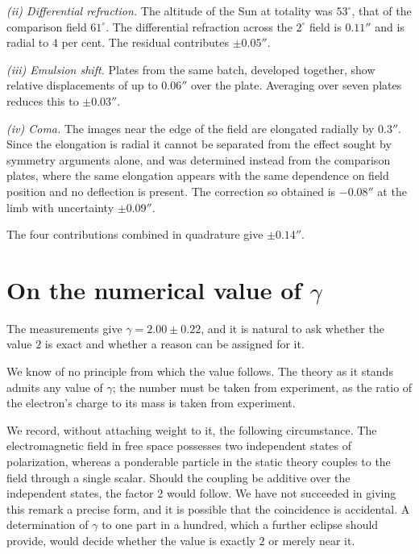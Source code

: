 \documentclass[aps,prd,reprint,amsmath,amssymb,nofootinbib,longbibliography]{revtex4-2}
\begin{document}
\emph{(ii) Differential refraction.} The altitude of the Sun at totality was $53^\circ$, that of the
comparison field $61^\circ$. The differential refraction across the $2^\circ$ field is $0.11''$ and
is radial to $4$ per cent. The residual contributes $\pm 0.05''$.

\emph{(iii) Emulsion shift.} Plates from the same batch, developed together, show relative
displacements of up to $0.06''$ over the plate. Averaging over seven plates reduces this to
$\pm 0.03''$.

\emph{(iv) Coma.} The images near the edge of the field are elongated radially by $0.3''$. Since the
elongation is radial it cannot be separated from the effect sought by symmetry arguments alone, and
was determined instead from the comparison plates, where the same elongation appears with the same
dependence on field position and no deflection is present. The correction so obtained is
$-0.08''$ at the limb with uncertainty $\pm 0.09''$.

The four contributions combined in quadrature give $\pm 0.14''$.

\section{On the numerical value of $\gamma$}
\label{app:gamma}

The measurements give $\gamma = 2.00 \pm 0.22$, and it is natural to ask whether the value $2$ is
exact and whether a reason can be assigned for it.

We know of no principle from which the value follows. The theory as it stands admits any value of
$\gamma$; the number must be taken from experiment, as the ratio of the electron's charge to its
mass is taken from experiment.

We record, without attaching weight to it, the following circumstance. The electromagnetic field in
free space possesses two independent states of polarization, whereas a ponderable particle in the
static theory couples to the field through a single scalar. Should the coupling be additive over the
independent states, the factor $2$ would follow. We have not succeeded in giving this remark a
precise form, and it is possible that the coincidence is accidental. A determination of $\gamma$ to
one part in a hundred, which a further eclipse should provide, would decide whether the value is
exactly $2$ or merely near it.
\end{document}
